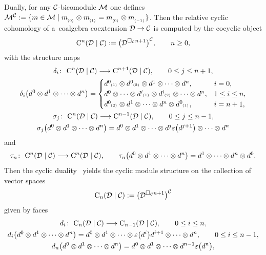 \documentclass[pdftex]{sigma}
\numberwithin{equation}{section}
\newcommand{\ps}[1]{~\hspace{-4pt}_{^{(#1)}}}
\newcommand{\ns}[1]{~\hspace{-4pt}_{_{{\langle#1\rangle}}}}
\begin{document}
Dually, for any ${\cal C}$-bicomodule ${\cal M}$ one def\/ines ${\cal M}^{\cal C}:=\{m\in {\cal M}\mid m\ns{0}\otimes
m\ns{1} =m\ns{0}\otimes m\ns{-1}\}$. Then the relative cyclic cohomology of a~coalgebra coextension ${\cal
D}\rightarrow {\cal C}$ is computed by the cocyclic object
\begin{gather}
\label{aux-rel-cyclic-coalg}
{\rm C}^n({\cal D}\mid{\cal C}):=\big({\cal D}^{\Box_{\cal C} n+1}\big)^{\cal C},
\qquad
n\geq 0,
\end{gather}
with the structure maps
\begin{gather*}%
\delta_i\colon \ {\rm C}^n({\cal D}\mid{\cal C}) \longrightarrow {\rm C}^{n+1}({\cal D}\mid{\cal C}),
\qquad
0 \leq j \leq n+1,
\\
\delta_i\big(d^0\otimes d^1\otimes \cdots\otimes d^n\big)
=\begin{cases}
d^0\ps{1}\otimes d^0\ps{2}\otimes d^1\otimes \cdots\otimes d^n, & i =0,
\\
d^0\otimes \cdots \otimes  d^i\ps{1}\otimes d^i\ps{2}\otimes \cdots \otimes d^n, & 1 \leq i\leq n,
\\
d^0\ps{2}\otimes d^1\otimes \cdots\otimes d^n\otimes d^0\ps{1}, & i =n+1,
\end{cases}
\\
\sigma_j\colon \ {\rm C}^n({\cal D}\mid{\cal C}) \longrightarrow {\rm C}^{n-1}({\cal D}\mid{\cal C}),
\qquad
0 \leq j \leq n-1,
\\
\sigma_j\big(d^0\otimes d^1\otimes \cdots\otimes d^n\big) =d^0\otimes d^1\otimes \cdots \otimes
d^{j}\varepsilon\big(d^{j+1}\big)\otimes \cdots \otimes d^n
\end{gather*}
and
\begin{gather*}%
\tau_n\colon \ {\rm C}^n({\cal D}\mid{\cal C}) \longrightarrow {\rm C}^n({\cal D}\mid{\cal C}),
\qquad
\tau_n\big(d^0\otimes d^1\otimes \cdots\otimes d^n\big) =d^1\otimes \cdots\otimes d^n\otimes d^0.
\end{gather*}
Then the cyclic duality~\cite{Conn83,KhalRang05} yields the cyclic module structure on the collection of vector spaces
\begin{gather}
\label{cyc-mod-coext}
{\rm C}_n({\cal D}\mid{\cal C}):=\big({\cal D}^{\Box_{\cal C} n+1}\big)^{\cal C}
\end{gather}
given by faces
\begin{gather*}%
d_i\colon \ {\rm C}_n({\cal D}\mid{\cal C}) \longrightarrow {\rm C}_{n-1}({\cal D}\mid{\cal C}),
\qquad
0 \leq i \leq n,
\\
d_i\big(d^0\otimes d^1\otimes \cdots\otimes d^n\big) =d^0\otimes d^1\otimes \cdots \otimes \varepsilon\big(d^i\big)d^{i+1}\otimes\cdots \otimes d^n,
\qquad
0 \leq i \leq n-1,
\\
d_n\big(d^0\otimes d^1\otimes \cdots\otimes d^n\big) =d^0\otimes d^1\otimes \cdots \otimes d^{n-1}\varepsilon\big(d^n\big),
\end{gather*}
\end{document}
